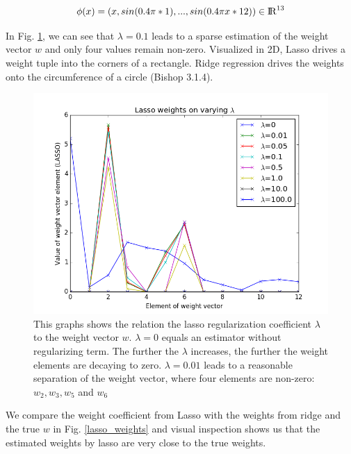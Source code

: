 \begin{equation}
\phi(x) = (x, sin(0.4\pi * 1),..., sin(0.4\pi x * 12)) \in{\rm I\!R}^{13}
\label{lasso_feature}
\end{equation}

In Fig. \ref{lasso_lambda}, we can see that $\lambda = 0.1$ leads to a sparse estimation of the weight vector $w$ and only four values remain non-zero. Visualized in 2D, Lasso drives a weight tuple into the corners of a rectangle. Ridge regression drives the weights onto the circumference of a circle (Bishop 3.1.4).

\begin{figure}[!ht]
   \centering
   \includegraphics[width=0.9\linewidth]{figures/lasso_lambda}
   \caption{This graphs shows the relation the lasso regularization coefficient $\lambda$ to the weight vector $w$. $\lambda = 0$ equals an estimator without regularizing term. The further the $\lambda$ increases, the further the weight elements are decaying to zero. $\lambda = 0.01$ leads to a reasonable separation of the weight vector, where four elements are non-zero: $w_2, w_3, w_5$ and $w_6$}
\label{lasso_lambda}
\end{figure}

We compare the weight coefficient from Lasso with the weights from ridge and the true $w$ in Fig. \ref{lasso_weights} and visual inspection shows us that the estimated weights by lasso are very close to the true weights.

